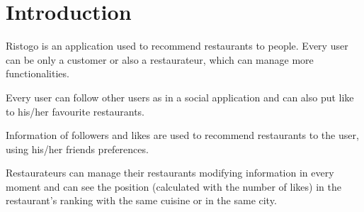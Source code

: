 \section{Introduction}

Ristogo is an application used to recommend restaurants to people. Every user
can be only a customer or also a restaurateur, which can manage more
functionalities.

Every user can follow other users as in a social application and can also put
like to his/her favourite restaurants.

Information of followers and likes are used to recommend restaurants to the
user, using his/her friends preferences.

Restaurateurs can manage their restaurants modifying information in every moment
and can see the position (calculated with the number of likes) in the
restaurant's ranking with the same cuisine or in the same city.
